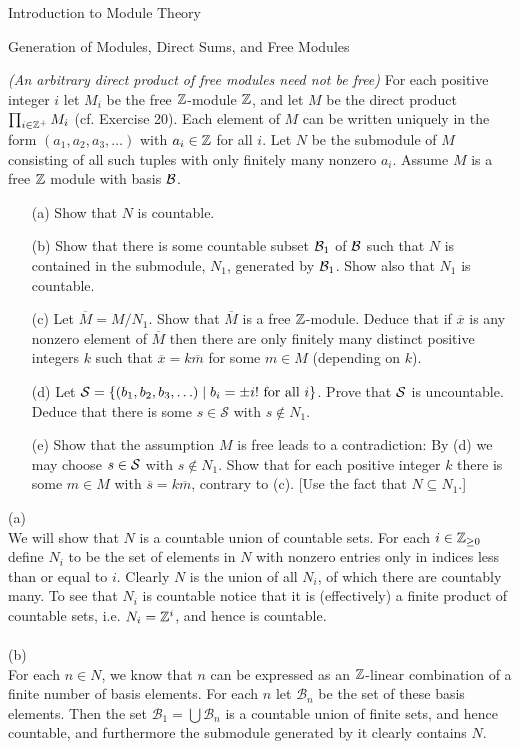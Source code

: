 \begin{chapter}{Introduction to Module Theory}
\begin{section}{Generation of Modules, Direct Sums, and Free Modules}
\begin{problem}\label{ex:10.3.24}
\emph{(An arbitrary direct product of free modules need not be free)} For each positive integer $i$ let $M_i$ be the free $\mathbb{Z}$-module $\mathbb{Z}$, and let $M$ be the direct product $\prod_{i\in\mathbb{Z}^+}M_i$ (cf. Exercise 20). Each element of $M$ can be written uniquely in the form $(a_1,a_2,a_3,\ldots)$ with $a_i\in \mathbb{Z}$ for all $i$. Let $N$ be the submodule of $M$ consisting of all such tuples with only finitely many nonzero $a_i$. Assume $M$ is a free $\mathbb{Z}$ module with basis $\mathcal{B}$. \begin{enumerate}
\item[(a)] Show that $N$ is countable.
\item[(b)] Show that there is some countable subset $\mathcal{B}_1$ of $\mathcal{B}$ such that $N$ is contained in the submodule, $N_1$, generated by $\mathcal{B}_1$. Show also that $N_1$ is countable.
\item[(c)] Let $\overline{M} = M/N_1$. Show that $\overline{M}$ is a free $\mathbb{Z}$-module. Deduce that if $\overline{x}$ is any nonzero element of $\overline{M}$ then there are only finitely many distinct positive integers $k$ such that $\overline{x} = k\overline{m}$ for some $m\in M$ (depending on $k$).
\item[(d)] Let $\mathcal{S} = \{(b_1,b_2,b_3,\ldots)\mid b_i=\pm i!\text{ for all } i\}$. Prove that $\mathcal{S}$ is uncountable. Deduce that there is some $s\in \mathcal{S}$ with $s\notin N_1$.
\item[(e)] Show that the assumption $M$ is free leads to a contradiction: By (d) we may choose $s\in\mathcal{S}$ with $s\notin N_1$. Show that for each positive integer $k$ there is some $m\in M$ with $\overline{s} = k\overline{m}$, contrary to (c). [Use the fact that $N\subseteq N_1$.]
\end{enumerate}
\end{problem}
\begin{solution}
(a)\\
We will show that $N$ is a countable union of countable sets. For each $i\in \mathbb{Z}_{\ge 0}$ define $N_i$ to be the set of elements in $N$ with nonzero entries only in indices less than or equal to $i$. Clearly $N$ is the union of all $N_i$, of which there are countably many. To see that $N_i$ is countable notice that it is (effectively) a finite product of countable sets, i.e. $N_i = \mathbb{Z}^i$, and hence is countable.\\\\
(b)\\
For each $n\in N$, we know that $n$ can be expressed as an $\mathbb{Z}$-linear combination of a finite number of basis elements. For each $n$ let $\mathcal B_n$ be the set of these basis elements. Then the set $\mathcal B_1 = \bigcup \mathcal B_n$ is a countable union of finite sets, and hence countable, and furthermore the submodule generated by it clearly contains $N$.


\end{solution}
\end{section}
\end{chapter}
